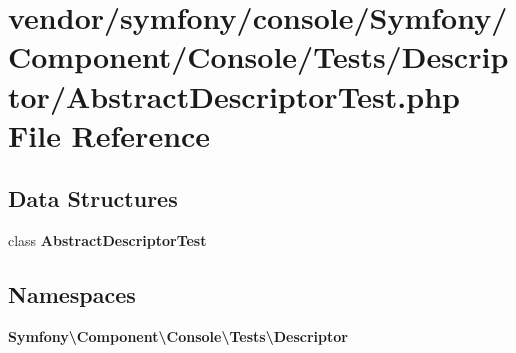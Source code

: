 \section{vendor/symfony/console/\+Symfony/\+Component/\+Console/\+Tests/\+Descriptor/\+Abstract\+Descriptor\+Test.php File Reference}
\label{_abstract_descriptor_test_8php}
\subsection*{Data Structures}
\begin{DoxyCompactItemize}
\item 
class {\bf Abstract\+Descriptor\+Test}
\end{DoxyCompactItemize}
\subsection*{Namespaces}
\begin{DoxyCompactItemize}
\item 
 {\bf Symfony\textbackslash{}\+Component\textbackslash{}\+Console\textbackslash{}\+Tests\textbackslash{}\+Descriptor}
\end{DoxyCompactItemize}
